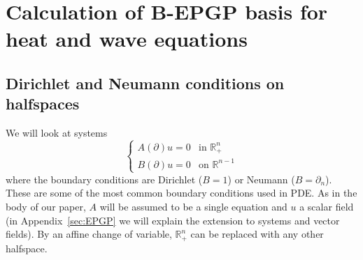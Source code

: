 \documentclass{article} %
\theoremstyle{plain}
\theoremstyle{definition}
\theoremstyle{remark}
\newcommand{\RR}{\mathbb{R}}
\begin{document}
\section{Calculation of B-EPGP basis for heat and wave equations}\label{sec:B-EPGP_calc}
\subsection{Dirichlet and Neumann conditions on halfspaces}
We will look at systems
$$
\begin{cases}
    A(\partial)u=0&\text{in }\RR^n_+\\
    B(\partial)u=0&\text{on }\RR^{n-1}
\end{cases}
$$
where the boundary conditions are Dirichlet ($B=1$) or Neumann ($B=\partial_n$). These are some of the most common boundary conditions used in PDE. As in the body of our paper, $A$ will be assumed to be a single equation and $u$ a scalar field (in Appendix~\ref{sec:EPGP} we will explain the extension to systems and vector fields). By an affine change of variable, $\RR^n_+$ can be replaced with any other halfspace.
\end{document}

